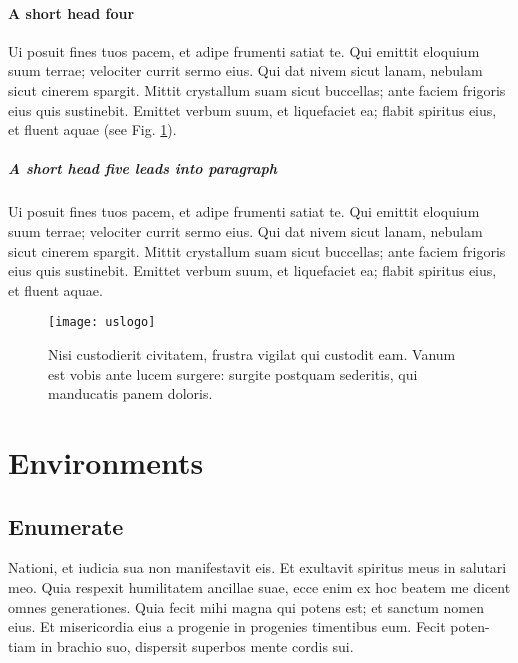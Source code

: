 \documentclass{jdsart}
\theoremstyle{plain}
\theoremstyle{remark}
\theoremstyle{definition}
\begin{document}
\paragraph{A short head four}
Ui posuit fines tuos pacem,
et adipe frumenti satiat te. Qui emittit eloquium suum terrae;
velociter currit sermo eius.  Qui dat nivem sicut lanam, nebulam
sicut cinerem spargit. Mittit crystallum suam sicut buccellas; ante
faciem frigoris eius quis sustinebit. Emittet verbum suum, et
liquefaciet ea; flabit spiritus eius, et fluent aquae (see Fig. \ref{f1}).

\subparagraph{A short head five leads into paragraph} Ui posuit fines tuos pacem,
et adipe frumenti satiat te. Qui emittit eloquium suum terrae;
velociter currit sermo eius.  Qui dat nivem sicut lanam, nebulam
sicut cinerem spargit. Mittit crystallum suam sicut buccellas; ante
faciem frigoris eius quis sustinebit. Emittet verbum suum, et
liquefaciet ea; flabit spiritus eius, et fluent aquae.


\begin{figure}[t]
\texttt{[image: uslogo]}%
\caption{Nisi custodierit civitatem, frustra vigilat qui custodit eam. Vanum
est vobis ante lucem surgere: surgite postquam sederitis, qui
manducatis panem doloris.}\label{f1}
\end{figure}


\section{Environments}

\subsection{Enumerate}

Nationi, et iudicia sua non manifestavit eis. Et exultavit spiritus meus
in salutari meo.  Quia respexit humilitatem ancillae suae, ecce enim ex
hoc beatem me dicent omnes generationes. Quia fecit mihi magna qui potens
est; et sanctum nomen eius. Et misericordia eius a progenie in progenies
timentibus eum. Fecit poten-tiam in brachio suo, dispersit superbos mente
cordis sui.
\end{document}
